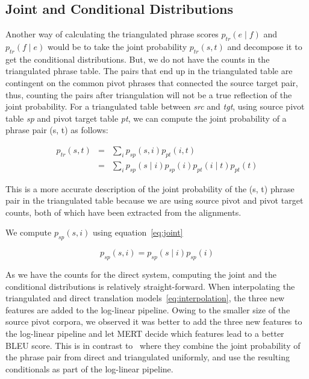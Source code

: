 \subsection{Joint and Conditional Distributions}
\label{subsec:joint}

Another way of calculating the triangulated phrase scores $p_{tr}(e \mid f)$ and $p_{tr}(f \mid e)$ would be to take the joint probability $p_{tr}(s, t)$ and decompose it to get the conditional distributions. But, we do not have the counts in the triangulated phrase table. The pairs that end up in the triangulated table are contingent on the common pivot phrases that connected the source target pair, thus, counting the pairs after triangulation will not be a true reflection of the joint probability. For a triangulated table between \emph{src} and \emph{tgt}, using source pivot table \emph{sp} and pivot target table \emph{pt}, we can compute the joint probability of a phrase pair (s, t) as follows:

        \begin{eqnarray*}
                p_{tr}(s, t) &=& \sum_{i}p_{sp}(s, i) p_{pt}(i, t) \\
                                &=& \sum_{i}p_{sp}(s \mid i) p_{sp}(i) p_{pt}(i \mid t) p_{pt}(t)
        \end{eqnarray*}



This is a more accurate description of the joint probability of the (s, t) phrase pair in the triangulated table because we are using source pivot and pivot target counts, both of which have been extracted from the alignments.

We compute $p_{sp}(s, i)$ using equation~\eqref{eq:joint} 

\begin{equation} \label{eq:joint}
	p_{sp}(s, i) = p_{sp}(s \mid i) p_{sp}(i)
\end{equation}

	

 As we have the counts for the direct system, computing the joint and the conditional distributions is relatively straight-forward. When interpolating the triangulated and direct translation models~\eqref{eq:interpolation}, the three new features are added to the log-linear pipeline. Owing to the smaller size of the source pivot corpora, we observed it was better to add the three new features to the log-linear pipeline and let MERT decide which features lead to a better BLEU score. This is in contrast to~\cite{Cohn:07} where they combine the joint probability of the phrase pair from direct and triangulated uniformly, and use the resulting conditionals as part of the log-linear pipeline.


